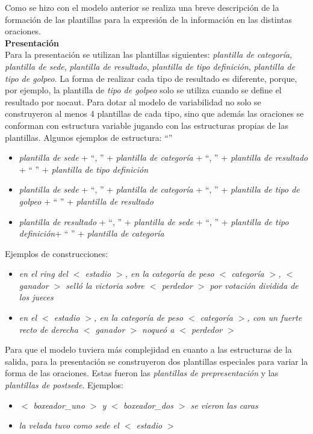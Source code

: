     Como se hizo con el modelo anterior se realiza una breve descripción de la formación de las plantillas para 
la expresión de la información en las distintas oraciones.\\

    \textbf{Presentación}\\

    Para la presentación se utilizan las plantillas siguientes: \textit{plantilla de categoría}, \textit{plantilla de sede}, 
\textit{plantilla de resultado}, \textit{plantilla de tipo definición}, \textit{plantilla de tipo de golpeo}. La forma de realizar cada tipo de resultado es diferente, porque, 
por ejemplo, la plantilla de \textit{tipo de golpeo} solo se utiliza cuando se define el resultado por nocaut. Para dotar 
al modelo de variabilidad no solo se construyeron al menos 4 plantillas de cada tipo, sino que además las oraciones se conforman 
con estructura variable jugando con las estructuras propias de las plantillas.
    Algunos ejemplos de estructura:  “”
    \begin{itemize}
        \item \textit{plantilla de sede} + “, ” + \textit{plantilla de categoría} + “, ” + \textit{plantilla de resultado} + “ ” + \textit{plantilla de tipo definición}
        \item \textit{plantilla de sede} + “, ” + \textit{plantilla de categoría} + “, ” + \textit{plantilla de tipo de golpeo} + “ ” + \textit{plantilla de resultado}
        \item \textit{plantilla de resultado} + “, ” + \textit{plantilla de sede} + “, ” + \textit{plantilla de tipo definición}+ “ ” + \textit{plantilla de categoría}
    \end{itemize}

    Ejemplos de construcciones:
    \begin{itemize}
        \item \textit{ en el ring del $<$ estadio $>$, en la categoría de peso $<$ categoría $>$, $<$ ganador $>$ selló la victoria 
        sobre $<$ perdedor $>$ por votación dividida de los jueces}
        \item \textit{ en el $<$ estadio $>$, en la categoría de peso $<$ categoría $>$, con un fuerte recto de derecha $<$ ganador $>$ noqueó a $<$ perdedor $>$}
    \end{itemize}

    Para que el modelo tuviera más complejidad en cuanto a las estructuras de la salida, para la presentación se construyeron dos 
plantillas especiales para variar la forma de las oraciones. Estas fueron las \textit{plantillas de prepresentación} y las 
\textit{plantillas de postsede}.
    Ejemplos:
    \begin{itemize}
        \item \textit{$<$ boxeador\_uno $>$ y $<$ boxeador\_dos $>$ se vieron las caras}
        \item \textit{la velada tuvo como sede el $<$ estadio $>$}
    \end{itemize}

